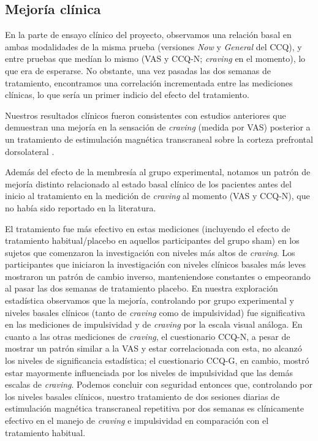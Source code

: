 \subsection{Mejoría clínica}
En la parte de ensayo clínico del proyecto, observamos una relación basal en ambas modalidades de la misma prueba (versiones \textit{Now} y \textit{General} del CCQ), y entre pruebas que medían lo mismo (VAS y CCQ-N; \textit{craving} en el momento), lo que era de esperarse. No obstante, una vez pasadas las dos semanas de tratamiento, encontramos una correlación incrementada entre las mediciones clínicas, lo que sería un primer indicio del efecto del tratamiento. \par
Nuestros resultados clínicos fueron consistentes con estudios anteriores que demuestran una mejoría en la sensación de \textit{craving} (medida por VAS) posterior a un tratamiento de estimulación magnética transcraneal sobre la corteza prefrontal dorsolateral \parencite{Politi2008, Terraneo2016}. \par
Además del efecto de la membresía al grupo experimental, notamos un patrón de mejoría distinto relacionado al estado basal clínico de los pacientes antes del inicio al tratamiento en la medición de \textit{craving} al momento (VAS y CCQ-N), que no había sido reportado en la literatura. \par
El tratamiento fue más efectivo en estas mediciones (incluyendo el efecto de tratamiento habitual/placebo en aquellos participantes del grupo sham) en los sujetos que comenzaron la investigación con niveles más altos de \textit{craving}. Los participantes que iniciaron la investigación con niveles clínicos basales más leves mostraron un patrón de cambio inverso, manteniendose constantes o empeorando al pasar las dos semanas de tratamiento placebo.
En nuestra exploración estadística observamos que la mejoría, controlando por grupo experimental y niveles basales clínicos (tanto de \textit{craving} como de impulsividad) fue significativa en las mediciones de impulsividad y de \textit{craving} por la escala visual análoga. En cuanto a las otras mediciones de \textit{craving}, el cuestionario  CCQ-N, a pesar de mostrar un patrón similar a la VAS y estar correlacionada con esta, no alcanzó los niveles de significancia estadística; el cuestionario CCQ-G, en cambio, mostró estar mayormente influenciada por los niveles de impulsividad que las demás escalas de \textit{craving}.
Podemos concluir con seguridad entonces que, controlando por los niveles basales clínicos, nuestro tratamiento de dos sesiones diarias de estimulación magnética transcraneal repetitiva por dos semanas es clínicamente efectivo en el manejo de \textit{craving} e impulsividad en comparación con el tratamiento habitual.

